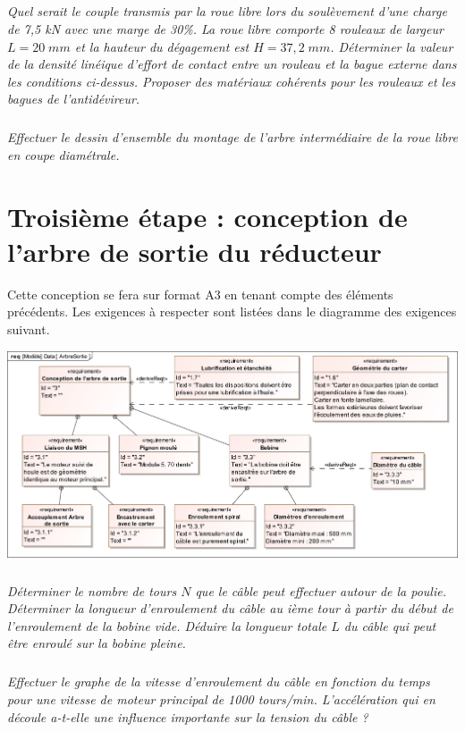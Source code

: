 \documentclass[10pt]{article}
\begin{document}
\subparagraph{}
\textit{Quel serait le couple transmis par la roue libre lors du soulèvement d'une charge de 7,5 kN avec une marge de 30\%.
La roue libre comporte 8 rouleaux de largeur $L=20\;mm$ et la hauteur du dégagement est $H=37,2\; mm$. Déterminer la valeur de la densité linéique d'effort de contact entre un rouleau et la bague externe dans les conditions ci-dessus.
Proposer des matériaux cohérents pour les rouleaux et les bagues de l'antidévireur.}


\subparagraph{}
\textit{Effectuer le dessin d'ensemble du montage de l'arbre intermédiaire de la roue libre en coupe diamétrale.}


\section{Troisième étape : conception de l'arbre de sortie du réducteur}

Cette conception se fera sur format A3 en tenant compte des éléments précédents. Les exigences à respecter sont listées dans le diagramme des exigences suivant. 

\begin{center}
\includegraphics[width=\textwidth]{images/SysML/ArbreSortie}
\end{center}




\subparagraph{}
\textit{Déterminer le nombre de tours $N$ que le câble peut effectuer autour de la poulie. 
Déterminer la longueur d'enroulement du câble au ième tour à partir du début de l'enroulement de la bobine vide.
Déduire la longueur totale $L$ du câble qui peut être enroulé sur la bobine pleine.}

\subparagraph{}
\textit{Effectuer le graphe de la vitesse d'enroulement du câble en fonction du temps pour une vitesse de moteur principal de 1000 tours/min.
L'accélération qui en découle a-t-elle une influence importante sur la tension du câble ?}
\end{document}
